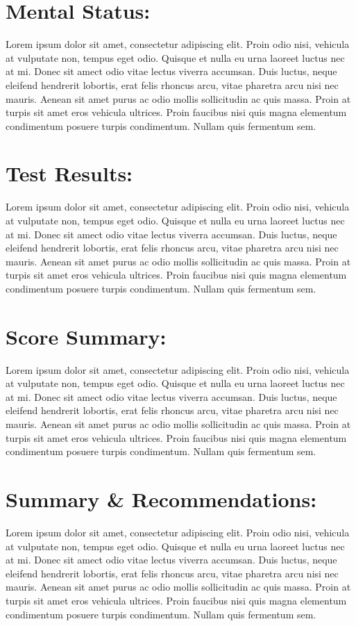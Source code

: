 \documentclass[12pt]{article}
\begin{document}
\section*{\textbf Mental Status:}
Lorem ipsum dolor sit amet, consectetur adipiscing elit. Proin odio nisi, vehicula at vulputate non, tempus eget odio. Quisque et nulla eu urna laoreet luctus nec at mi. Donec sit amect odio vitae lectus viverra accumsan. Duis luctus, neque eleifend hendrerit lobortis, erat felis rhoncus arcu, vitae pharetra arcu nisi nec mauris. Aenean sit amet purus ac odio mollis sollicitudin ac quis massa. Proin at turpis sit amet eros vehicula ultrices. Proin faucibus nisi quis magna elementum condimentum posuere turpis condimentum. Nullam quis fermentum sem.

\section*{\textbf Test Results:}
Lorem ipsum dolor sit amet, consectetur adipiscing elit. Proin odio nisi, vehicula at vulputate non, tempus eget odio. Quisque et nulla eu urna laoreet luctus nec at mi. Donec sit amect odio vitae lectus viverra accumsan. Duis luctus, neque eleifend hendrerit lobortis, erat felis rhoncus arcu, vitae pharetra arcu nisi nec mauris. Aenean sit amet purus ac odio mollis sollicitudin ac quis massa. Proin at turpis sit amet eros vehicula ultrices. Proin faucibus nisi quis magna elementum condimentum posuere turpis condimentum. Nullam quis fermentum sem.

\section*{\textbf Score Summary:}
Lorem ipsum dolor sit amet, consectetur adipiscing elit. Proin odio nisi, vehicula at vulputate non, tempus eget odio. Quisque et nulla eu urna laoreet luctus nec at mi. Donec sit amect odio vitae lectus viverra accumsan. Duis luctus, neque eleifend hendrerit lobortis, erat felis rhoncus arcu, vitae pharetra arcu nisi nec mauris. Aenean sit amet purus ac odio mollis sollicitudin ac quis massa. Proin at turpis sit amet eros vehicula ultrices. Proin faucibus nisi quis magna elementum condimentum posuere turpis condimentum. Nullam quis fermentum sem.

\section*{\textbf Summary \& Recommendations:}
Lorem ipsum dolor sit amet, consectetur adipiscing elit. Proin odio nisi, vehicula at vulputate non, tempus eget odio. Quisque et nulla eu urna laoreet luctus nec at mi. Donec sit amect odio vitae lectus viverra accumsan. Duis luctus, neque eleifend hendrerit lobortis, erat felis rhoncus arcu, vitae pharetra arcu nisi nec mauris. Aenean sit amet purus ac odio mollis sollicitudin ac quis massa. Proin at turpis sit amet eros vehicula ultrices. Proin faucibus nisi quis magna elementum condimentum posuere turpis condimentum. Nullam quis fermentum sem.
\end{document}
